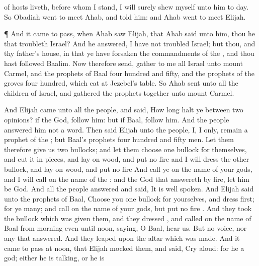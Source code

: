 {{} of
hosts
liveth,
before whom I
stand, I will surely
shew myself unto him to
day.
So
Obadiah
went to
meet
Ahab, and
told him: and
Ahab
went to
meet
Elijah.
\par }{\PP {}¶ And it came to pass, when
Ahab
saw
Elijah, that
Ahab
said unto him,
{} thou he that
troubleth
Israel?
And he
answered, I have not
troubled
Israel; but thou, and thy
father’s
house, in that ye have
forsaken the
commandments of the
{}, and thou hast
followed
Baalim.
Now therefore
send,
{}
gather to me all
Israel unto
mount
Carmel, and the
prophets of
Baal
four
hundred and
fifty, and the
prophets of the
groves
four
hundred, which
eat at
Jezebel’s
table.
So
Ahab
sent unto all the
children of
Israel, and
gathered the
prophets
together unto
mount
Carmel.
\par }{\PP {}And
Elijah
came unto all the
people, and
said, How
long
halt ye between
two
opinions? if the
{}
{}
God, follow him: but if
Baal,
{}
follow him. And the
people
answered him not a
word.
Then
said
Elijah unto the
people, I,
{} I only,
remain a
prophet of the
{}; but
Baal’s
prophets
{}
four
hundred and
fifty
men.
Let them therefore
give us
two
bullocks; and let them
choose
one
bullock for themselves, and cut it in
pieces, and
lay
{} on
wood, and
put no
fire
{} and I will
dress the
other
bullock, and
lay
{} on
wood, and
put no
fire
{}
And
call ye on the
name of your
gods, and I will
call on the
name of the
{}: and the
God that
answereth by
fire, let him be
God. And all the
people
answered and
said, It is
well
spoken.
And
Elijah
said unto the
prophets of
Baal,
Choose you
one
bullock for yourselves, and
dress
{}
first; for ye
{}
many; and
call on the
name of your
gods, but
put no
fire
{}.
And they
took the
bullock which was
given them, and they
dressed
{}, and
called on the
name of
Baal from
morning even until
noon,
saying, O
Baal,
hear us. But
{}
no
voice, nor any that
answered. And they
leaped upon the
altar which was
made.
And it came to pass at
noon, that
Elijah
mocked them, and
said,
Cry
aloud: for he
{} a
god; either he is
talking, or he is
}
